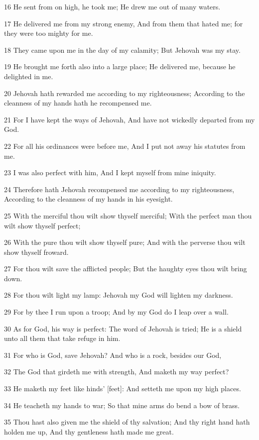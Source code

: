 \par 16 He sent from on high, he took me; He drew me out of many waters.
\par 17 He delivered me from my strong enemy, And from them that hated me; for they were too mighty for me.
\par 18 They came upon me in the day of my calamity; But Jehovah was my stay.
\par 19 He brought me forth also into a large place; He delivered me, because he delighted in me.
\par 20 Jehovah hath rewarded me according to my righteousness; According to the cleanness of my hands hath he recompensed me.
\par 21 For I have kept the ways of Jehovah, And have not wickedly departed from my God.
\par 22 For all his ordinances were before me, And I put not away his statutes from me.
\par 23 I was also perfect with him, And I kept myself from mine iniquity.
\par 24 Therefore hath Jehovah recompensed me according to my righteousness, According to the cleanness of my hands in his eyesight.
\par 25 With the merciful thou wilt show thyself merciful; With the perfect man thou wilt show thyself perfect;
\par 26 With the pure thou wilt show thyself pure; And with the perverse thou wilt show thyself froward.
\par 27 For thou wilt save the afflicted people; But the haughty eyes thou wilt bring down.
\par 28 For thou wilt light my lamp: Jehovah my God will lighten my darkness.
\par 29 For by thee I run upon a troop; And by my God do I leap over a wall.
\par 30 As for God, his way is perfect: The word of Jehovah is tried; He is a shield unto all them that take refuge in him.
\par 31 For who is God, save Jehovah? And who is a rock, besides our God,
\par 32 The God that girdeth me with strength, And maketh my way perfect?
\par 33 He maketh my feet like hinds' [feet]: And setteth me upon my high places.
\par 34 He teacheth my hands to war; So that mine arms do bend a bow of brass.
\par 35 Thou hast also given me the shield of thy salvation; And thy right hand hath holden me up, And thy gentleness hath made me great.
